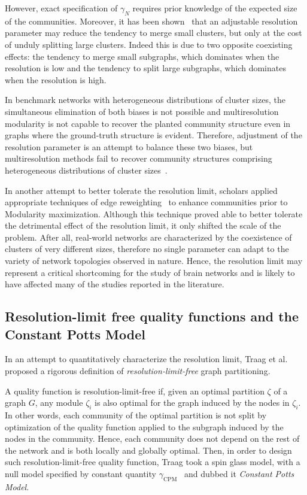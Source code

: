 However, exact specification of $\gamma_{N}$ requires prior knowledge of the expected size of the communities.
Moreover, it has been shown~\cite{lancichinetti2011} that an adjustable resolution parameter may reduce the tendency to merge small clusters, but only at the cost of unduly splitting large clusters. 
Indeed this is due to two opposite coexisting effects: the tendency to merge small subgraphs, which dominates when the resolution is low and the tendency to split large subgraphs, which dominates when the resolution is high.

In benchmark networks with heterogeneous distributions of cluster sizes, the simultaneous elimination of both biases is not possible and multiresolution modularity is not capable to recover the planted community structure even in graphs where the ground-truth structure is evident.
Therefore, adjustment of the resolution parameter is an attempt to balance these two biases, but multiresolution methods fail to recover community structures comprising heterogeneous distributions of cluster sizes~\cite{lancichinetti2011}. 

In another attempt to better tolerate the resolution limit, scholars applied appropriate techniques of edge reweighting~\cite{berry2011} to enhance communities prior to Modularity maximization.
Although this technique proved able to better tolerate the detrimental effect of the resolution limit, it only shifted the scale of the problem.
After all, real-world networks are characterized by the coexistence of clusters of very different sizes, therefore no single parameter can adapt to the variety of network topologies observed in nature.
Hence, the resolution limit may represent a critical shortcoming for the study of brain networks and is likely to have affected many of the studies reported in the literature.

\subsection{Resolution-limit free quality functions and the Constant Potts Model}
In an attempt to quantitatively characterize the resolution limit, Traag et al.~\cite{traag2011} proposed a rigorous definition of \emph{resolution-limit-free} graph partitioning.

A quality function is resolution-limit-free if, given an optimal partition $\zeta$ of a graph $G$, any module $\zeta_i$ is also optimal for the graph induced by the nodes in $\zeta_i$.
In other words, each community of the optimal partition is not split by optimization of the quality function applied to the subgraph induced by the nodes in the community.
Hence, each community does not depend on the rest of the network and is both locally and globally optimal.
Then, in order to design such resolution-limit-free quality function, Traag took a spin glass model, with a null model specified by constant quantity $\gamma_{\textrm{CPM}}$~\cite{traag2011} and dubbed it \emph{Constant Potts Model}.

